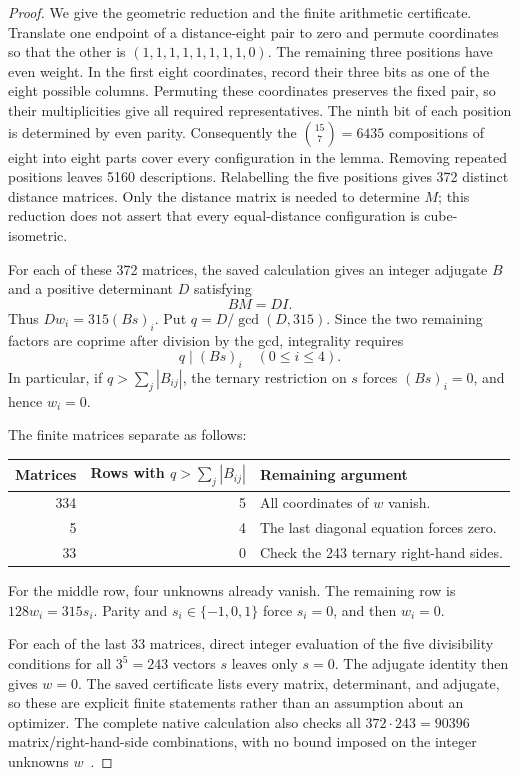 \begin{proof}
We give the geometric reduction and the finite arithmetic certificate.
Translate one endpoint of a distance-eight pair to zero and permute
coordinates so that the other is $(1,1,1,1,1,1,1,1,0)$. The remaining
three positions have even weight. In the first eight coordinates,
record their three bits as one of the eight possible columns. Permuting
these coordinates preserves the fixed pair, so their multiplicities
give all required representatives. The ninth bit of each position is
determined by even parity. Consequently the $\binom{15}{7}=6435$
compositions of eight into eight parts cover every configuration in
the lemma. Removing repeated positions leaves 5160 descriptions.
Relabelling the five positions gives 372 distinct distance matrices.
Only the distance matrix is needed to determine $M$; this reduction
does not assert that every equal-distance configuration is cube-isometric.

For each of these 372 matrices, the saved calculation gives an integer
adjugate $B$ and a positive determinant $D$ satisfying
\[
BM=DI.
\]
Thus $Dw_i=315(Bs)_i$. Put $q=D/\gcd(D,315)$. Since the two remaining
factors are coprime after division by the gcd, integrality requires
\[
q\mid(Bs)_i\quad(0\le i\le4).
\]
In particular, if $q>\sum_j|B_{ij}|$, the ternary restriction on $s$
forces $(Bs)_i=0$, and hence $w_i=0$.

The finite matrices separate as follows:
\begin{center}
\begin{tabular}{rrl}
\toprule
Matrices & Rows with $q>\sum_j|B_{ij}|$ & Remaining argument\\
\midrule
334 & 5 & All coordinates of $w$ vanish.\\
5 & 4 & The last diagonal equation forces zero.\\
33 & 0 & Check the 243 ternary right-hand sides.\\
\bottomrule
\end{tabular}
\end{center}
For the middle row, four unknowns already vanish. The remaining row is
$128w_i=315s_i$. Parity and $s_i\in\{-1,0,1\}$ force $s_i=0$, and then
$w_i=0$.

For each of the last 33 matrices, direct integer evaluation of the
five divisibility conditions for all $3^5=243$ vectors $s$ leaves only
$s=0$. The adjugate identity then gives $w=0$. The saved certificate
lists every matrix, determinant, and adjugate, so these are explicit
finite statements rather than an assumption about an optimizer.
The complete native calculation also checks all
$372\cdot243=90396$ matrix/right-hand-side combinations, with no bound
imposed on the integer unknowns $w$~\cite{research240}.
\end{proof}

